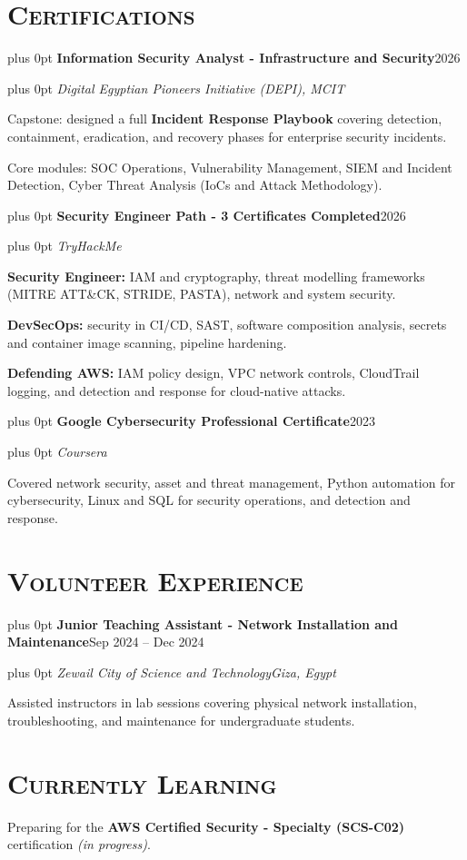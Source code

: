 \documentclass[10pt,letterpaper]{article}
\newcommand{\headerrow}[2]{%
  \begingroup\rightskip=0pt plus 0pt\relax
  #1\hfill #2\par\endgroup}
\newcommand{\entry}[4]{%
  \headerrow{\textbf{#1}}{#2}%
  \headerrow{\textit{#3}}{\textit{#4}}%
  \vspace{0.04em}}
\newenvironment{block}{\vspace{0.03em}\begingroup}{\endgroup\vspace{0.06em}}
\begin{document}
\section*{\textsc{Certifications}}
\begin{block}

\entry{Information Security Analyst - Infrastructure and Security}{2026}
      {Digital Egyptian Pioneers Initiative (DEPI), MCIT}{}
\begin{tight}
  \item Capstone: designed a full \textbf{Incident Response Playbook} covering detection, containment, eradication, and recovery phases for enterprise security incidents.
  \item Core modules: SOC Operations, Vulnerability Management, SIEM and Incident Detection, Cyber Threat Analysis (IoCs and Attack Methodology).
\end{tight}
\vspace{0.18em}

\entry{Security Engineer Path - 3 Certificates Completed}{2026}
      {TryHackMe}{}
\begin{tight}
  \item \textbf{Security Engineer:} IAM and cryptography, threat modelling frameworks (MITRE ATT\&CK, STRIDE, PASTA), network and system security.
  \item \textbf{DevSecOps:} security in CI/CD, SAST, software composition analysis, secrets and container image scanning, pipeline hardening.
  \item \textbf{Defending AWS:} IAM policy design, VPC network controls, CloudTrail logging, and detection and response for cloud-native attacks.
\end{tight}
\vspace{0.18em}

\entry{Google Cybersecurity Professional Certificate}{2023}
      {Coursera}{}
\begin{tight}
  \item Covered network security, asset and threat management, Python automation for cybersecurity, Linux and SQL for security operations, and detection and response.
\end{tight}
\end{block}

\section*{\textsc{Volunteer Experience}}
\begin{block}
\entry{Junior Teaching Assistant - Network Installation and Maintenance}{Sep 2024 -- Dec 2024}
      {Zewail City of Science and Technology}{Giza, Egypt}
\begin{tight}
  \item Assisted instructors in lab sessions covering physical network installation, troubleshooting, and maintenance for undergraduate students.
\end{tight}
\end{block}

\section*{\textsc{Currently Learning}}
\begin{block}
Preparing for the \textbf{AWS Certified Security - Specialty (SCS-C02)} certification \textit{(in progress)}.
\end{block}
\end{document}
